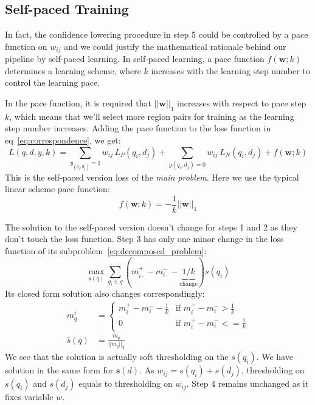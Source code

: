 \subsection{Self-paced Training}
\label{sec:self_pace}
In fact, the confidence lowering procedure in step 5 could be controlled by a pace function\cite{jiang2015self} on $w_{ij}$ and we could justify the mathematical rationale behind our pipeline by self-paced learning. 
In self-paced learning, a pace function $f(\mathbf{w};k)$ determines a learning scheme, where $k$ increases with the learning step number to control the learning pace. 

In the pace function, it is required that $||\mathbf{w}||_1$ increases with respect to pace step $k$, which means that we'll select more region pairs for training as the learning step number increases. Adding the pace function to the loss function in eq~\eqref{eq:correspondence}, we get:
\small
\begin{equation}
L(q, d, y, k) = \sum_{y_{(q_i, d_j)} = 1} w_{ij}\,L_P(q_i, d_j) + \sum_{y(q_i, d_j) = 0} w_{ij}\,L_N(q_i, d_j) + f(\mathbf{w};k)
\end{equation}
\normalsize
This is the self-paced version loss of the \emph{main problem}. 
Here we use the typical linear scheme pace function:
\begin{equation}
f(\mathbf{w};k) = -\frac{1}{k}||\mathbf{w}||_1
\end{equation}

The solution to the self-paced version doesn't change for steps 1 and 2 as they don't touch the loss function. 
Step 3 has only one minor change in the loss function of its subproblem~\eqref{eq:decomposed_problem}:
\small
\begin{equation}
\max_{\mathbf{s}(q)} \sum_{q_i \in q} (m_{i\cdot}^+ - m_{i\cdot}^- - \underbrace{1 / k}_{\text{change}}) s(q_i)
\end{equation}
\normalsize
Its closed form solution also changes correspondingly:
\small
\begin{equation}
\label{eq:truncate}
\begin{aligned}
m_q^{i} &= \left\{
  \begin{array}{rl}
m_i^+ - m_i^- - \frac{1}{k} & \text{if } m_i^+ - m_i^- > \frac{1}{k}\\
0 & \text{if } m_i^+ - m_i^- <= \frac{1}{k}
  \end{array}\right. \\
\hat{s}(q) &= \frac{m_q}{||m_q||_2}
\end{aligned}
\end{equation}
\normalsize
We see that the solution is actually soft thresholding on the $s(q_i)$. 
We have solution in the same form for $\mathbf{s}(d)$. As $w_{ij} = s(q_i) + s(d_j)$, thresholding on $s(q_i)$ and $s(d_j)$ equals to thresholding on $w_{ij}$. 
Step 4 remains unchanged as it fixes variable $w$. 


